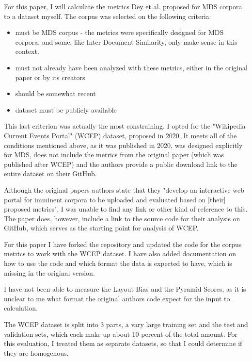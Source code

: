 \documentclass[../main.tex]{subfiles}
\begin{document}
For this paper, I will calculate the metrics Dey et al. proposed for MDS corpora to a dataset myself.
The corpus was selected on the following criteria:

\begin{itemize}
    \item must be MDS corpus - the metrics were specifically designed for MDS corpora, and some, like Inter Document Similarity, only make sense in this context.
    \item must not already have been analyzed with these metrics, either in the original paper or by its creators
    \item should be somewhat recent
    \item dataset must be publicly available
\end{itemize}

This last criterion was actually the most constraining. I opted for the "Wikipedia Current Events Portal" (WCEP) dataset, proposed in 2020. \cite{WCEP-gholipour-ghalandari-etal-2020-large}
It meets all of the conditions mentioned above, as it was published in 2020, was designed explicitly for MDS, does not include the metrics from the original paper (which was published after WCEP) and the authors provide a public download link to the entire dataset on their GitHub.\cite{WCEP-Github-complementizer_2022}


Although the original papers authors state that they "develop an interactive web portal for imminent corpora to be uploaded and evaluated based
on [their] proposed metrics", I was unable to find any link or other kind of reference to this.
The paper does, however, include a link to the source code for their analysis on GitHub, which serves as the starting point for analysis of WCEP.

For this paper I have forked the repository and updated the code for the corpus metrics to work with the WCEP dataset.
I have also added documentation on how to use the code and which format the data is expected to have, which is missing in the original version.

I have not been able to measure the Layout Bias and the Pyramid Scores, as it is unclear to me what format the original authors code expect for the input to calculation.

The WCEP dataset is split into 3 parts, a vary large training set and the test and validation sets, which each make up about 10 percent of the total amount.
For this evaluation, I treated them as separate datasets, so that I could determine if they are homogenous.

\end{document}
